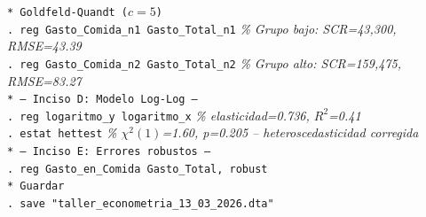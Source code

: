 \documentclass[12pt,a4paper]{article}
\begin{document}
\begin{cajacomando}[title=Log de Stata -- Problema 2.15 completo]
\texttt{* Goldfeld-Quandt ($c=5$)}\\
\texttt{. reg Gasto\_Comida\_n1 Gasto\_Total\_n1} \hfill \textit{\% Grupo bajo: SCR=43{,}300, RMSE=43.39}\\
\texttt{. reg Gasto\_Comida\_n2 Gasto\_Total\_n2} \hfill \textit{\% Grupo alto: SCR=159{,}475, RMSE=83.27}\\[3pt]
\texttt{* --- Inciso D: Modelo Log-Log ---}\\
\texttt{. reg logaritmo\_y logaritmo\_x} \hfill \textit{\% elasticidad=0.736, $R^2$=0.41}\\
\texttt{. estat hettest} \hfill \textit{\% $\chi^2(1)$=1.60, p=0.205 -- heteroscedasticidad corregida}\\[3pt]
\texttt{* --- Inciso E: Errores robustos ---}\\
\texttt{. reg Gasto\_en\_Comida Gasto\_Total, robust}\\[3pt]
\texttt{* Guardar}\\
\texttt{. save "taller\_econometria\_13\_03\_2026.dta"}
\end{cajacomando}
\end{document}
